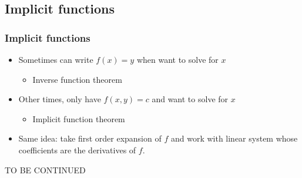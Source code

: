 \documentclass[compress]{beamer}
\begin{document}
\subsection{Implicit functions}

\begin{frame}\frametitle{Implicit functions}
  \begin{itemize}
  \item Sometimes can write $f(x) = y$ when want to solve for $x$ 
    \begin{itemize}
    \item Inverse function theorem
    \end{itemize}
  \item Other times, only have $f(x,y) = c$ and want to solve for $x$
    \begin{itemize}
    \item Implicit function theorem
    \end{itemize}
  \item Same idea: take first order expansion of $f$ and work with
    linear system whose coefficients are the derivatives of $f$. 
  \end{itemize}
\end{frame}

\begin{frame}
  TO BE CONTINUED
\end{frame}

\end{document}
